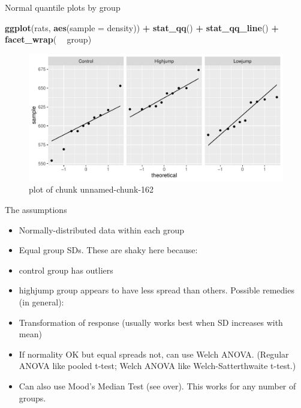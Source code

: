 \documentclass[ignorenonframetext,]{beamer}
\newenvironment{Shaded}{\begin{snugshade}}{\end{snugshade}}
\newcommand{\DataTypeTok}[1]{\textcolor[rgb]{0.13,0.29,0.53}{#1}}
\newcommand{\KeywordTok}[1]{\textcolor[rgb]{0.13,0.29,0.53}{\textbf{#1}}}
\newcommand{\NormalTok}[1]{#1}
\newcommand{\OperatorTok}[1]{\textcolor[rgb]{0.81,0.36,0.00}{\textbf{#1}}}
\newcommand{\StringTok}[1]{\textcolor[rgb]{0.31,0.60,0.02}{#1}}
\providecommand{\tightlist}{%
  \setlength{\itemsep}{0pt}\setlength{\parskip}{0pt}}
\begin{document}
\begin{frame}[fragile]{Normal quantile plots by group}
\protect\hypertarget{normal-quantile-plots-by-group}{}

\begin{Shaded}
\begin{Highlighting}[]
\KeywordTok{ggplot}\NormalTok{(rats, }\KeywordTok{aes}\NormalTok{(}\DataTypeTok{sample =}\NormalTok{ density)) }\OperatorTok{+}\StringTok{ }\KeywordTok{stat_qq}\NormalTok{() }\OperatorTok{+}\StringTok{ }
\StringTok{  }\KeywordTok{stat_qq_line}\NormalTok{() }\OperatorTok{+}\StringTok{ }\KeywordTok{facet_wrap}\NormalTok{( }\OperatorTok{~}\StringTok{ }\NormalTok{group)}
\end{Highlighting}
\end{Shaded}

\begin{figure}
\centering
\includegraphics{figure/unnamed-chunk-162-1.pdf}
\caption{plot of chunk unnamed-chunk-162}
\end{figure}

\end{frame}

\begin{frame}{The assumptions}
\protect\hypertarget{the-assumptions}{}

\begin{itemize}
\tightlist
\item
  Normally-distributed data within each group
\item
  Equal group SDs. These are shaky here because:
\item
  control group has outliers
\item
  highjump group appears to have less spread than others. Possible
  remedies (in general):
\item
  Transformation of response (usually works best when SD increases with
  mean)
\item
  If normality OK but equal spreads not, can use Welch ANOVA. (Regular
  ANOVA like pooled t-test; Welch ANOVA like Welch-Satterthwaite
  t-test.)
\item
  Can also use Mood's Median Test (see over). This works for any number
  of groups.
\end{itemize}

\end{frame}
\end{document}
